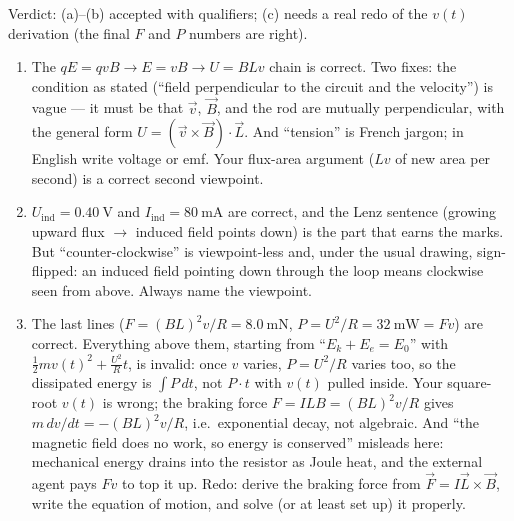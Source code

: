 \begin{feedback}[\cref{ex:em-7}]
Verdict: (a)--(b) accepted with qualifiers; (c) needs a real redo of the $v(t)$ derivation (the final $F$ and $P$ numbers are right).
\begin{enumerate}[label=(\alph*)]
  \item The $qE = qvB \to E = vB \to U = BLv$ chain is correct. Two fixes: the condition as stated (``field perpendicular to the circuit and the velocity'') is vague --- it must be that $\vec{v}$, $\vec{B}$, and the rod are mutually perpendicular, with the general form $U = (\vec{v}\times\vec{B})\cdot\vec{L}$. And ``tension'' is French jargon; in English write voltage or emf. Your flux-area argument ($Lv$ of new area per second) is a correct second viewpoint.
  \item $U_\text{ind} = 0.40\ \mathrm{V}$ and $I_\text{ind} = 80\ \mathrm{mA}$ are correct, and the Lenz sentence (growing upward flux $\to$ induced field points down) is the part that earns the marks. But ``counter-clockwise'' is viewpoint-less and, under the usual drawing, sign-flipped: an induced field pointing down through the loop means clockwise seen from above. Always name the viewpoint.
  \item The last lines ($F = (BL)^2v/R = 8.0\ \mathrm{mN}$, $P = U^2/R = 32\ \mathrm{mW} = Fv$) are correct. Everything above them, starting from ``$E_k + E_e = E_0$'' with $\frac{1}{2}mv(t)^2 + \frac{U^2}{R}t$, is invalid: once $v$ varies, $P = U^2/R$ varies too, so the dissipated energy is $\int P\,dt$, not $P\cdot t$ with $v(t)$ pulled inside. Your square-root $v(t)$ is wrong; the braking force $F = ILB = (BL)^2v/R$ gives $m\,dv/dt = -(BL)^2v/R$, i.e.\ exponential decay, not algebraic. And ``the magnetic field does no work, so energy is conserved'' misleads here: mechanical energy drains into the resistor as Joule heat, and the external agent pays $Fv$ to top it up. Redo: derive the braking force from $\vec{F} = I\vec{L}\times\vec{B}$, write the equation of motion, and solve (or at least set up) it properly.
\end{enumerate}
\end{feedback}
